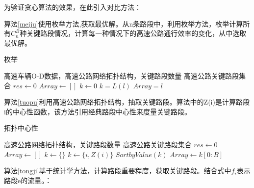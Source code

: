     	为验证贪心算法的效果，在此引入对比方法：

    	算法\ref{meiju}使用枚举方法,获取最优解。从n条路段中，利用枚举方法，枚举计算所有$C_n^B$种关键路段情况，计算每一种情况下的高速公路通行效率的变化，从中选取最优解。

    	\begin{algorithm}[!h]
        \caption{枚举} 
        \label{meiju} 
        \begin{algorithmic}[1] %
            \Require 高速车辆O-D数据，高速公路网络拓扑结构，关键路段数量
            \Ensure 高速公路关键路段集合
                \State $res\gets 0$  
                \State $Array\gets []$  
                \State $k\gets 0$ 
                        	\State $k=L(l)$  
                        	\State $Array=l$  
                    	\EndIf
                	\EndFor  
                \State {}  
            \EndFunction  
        \end{algorithmic}  
    	\end{algorithm} 

    	算法\ref{tuopu}利用高速公路网络拓扑结构，抽取关键路段。算法中的Z(i)是计算路段i的中心性函数\parencite{Phillip1972Factoring}，该方法引用经典路段中心性来度量关键路段。

    	\begin{algorithm}[!h]
        \caption{拓扑中心性}  
        \label{tuopu}
        \begin{algorithmic}[1] %
            \Require 高速公路网络拓扑结构，关键路段数量
            \Ensure 高速公路关键路段集合
                \State $res\gets 0$  
                \State $Array\gets []$  
                \State $k\gets \{\}$ 
                		\State $k\gets \{i,Z(i)\}$ 
                	\EndFor  
                \State $SortbyValue(k)$
                \State $Array\gets k[0:B]$
                \State {}  
            \EndFunction  
        \end{algorithmic}  
    	\end{algorithm} 

    	算法\ref{tongji}基于统计学方法，计算路段重要程度，获取关键路段。结合式中$f_i$表示路段e的流量。：

